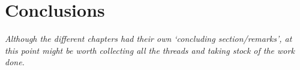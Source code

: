 \chapter*{Conclusions}
{\itshape Although the different chapters had their own `concluding section/remarks', at this point might be worth collecting all the threads and taking stock of the work done.}
